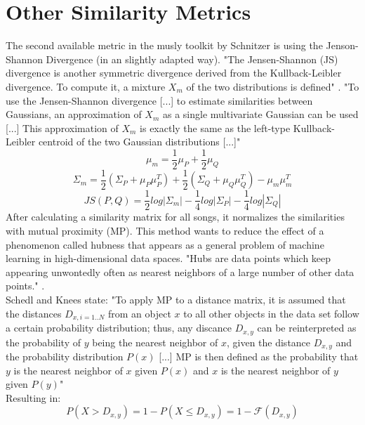 \section{Other Similarity Metrics}
The second available metric in the musly toolkit by Schnitzer is using the Jenson-Shannon Divergence (in an slightly adapted way). "The Jensen-Shannon (JS) divergence is another symmetric divergence derived from the Kullback-Leibler divergence. To compute it, a mixture $X_m$ of the two distributions is defined" \cite[p. 43]{schnitzer1}. "To use the Jensen-Shannon divergence [...] to estimate similarities between Gaussians, an approximation of $X_m$ as a single multivariate Gaussian can be used [...] This approximation of $X_m$ is exactly the same as the left-type Kullback-Leibler centroid of the two Gaussian distributions [...]" \cite[p. 44]{schnitzer1} 
\begin{equation} \label{eq:jsl1}
\mu_m = \frac{1}{2} \mu_P + \frac{1}{2} \mu_Q
\end{equation}
\begin{equation} \label{eq:jsl2}
\Sigma_m = \frac{1}{2} (\Sigma_P + \mu_P\mu_P^T) + \frac{1}{2} (\Sigma_Q + \mu_Q\mu_Q^T) - \mu_m\mu_m^T
\end{equation}
\begin{equation} \label{eq:jsl3}
JS(P, Q) = \frac{1}{2} log|\Sigma_m| - \frac{1}{4} log |\Sigma_P| - \frac{1}{4} log |\Sigma_Q|
\end{equation}
After calculating a similarity matrix for all songs, it normalizes the similarities with mutual proximity (MP). \cite{musly2}  This method wants to reduce the effect of a phenomenon called hubness that appears as a general problem of machine learning in high-dimensional data spaces. "Hubs are data points which keep appearing unwontedly often as nearest neighbors of a large number of other data points." \cite[p. 66]{schnitzer1}.\\
Schedl and Knees state: "To apply MP to a distance matrix, it is assumed that the distances $D_{x,i = 1..N}$ from an object $x$ to all other objects in the data set follow a certain probability distribution; thus, any discance $D_{x,y}$ can be reinterpreted as the probability of $y$ being the nearest neighbor of $x$, given the distance $D_{x,y}$ and the probability distribution $P(x)$ [...] MP is then defined as the probability that $y$ is the nearest neighbor of $x$ given $P(x)$ and $x$ is the nearest neighbor of $y$ given $P(y)$" \cite[p. 80]{knees1}\\
Resulting in: 
\begin{equation} \label{eq:mp1}
P(X > D_{x,y}) = 1 - P(X \leq D_{x,y}) = 1 - \mathscr{F}(D_{x,y}) 
\end{equation}
